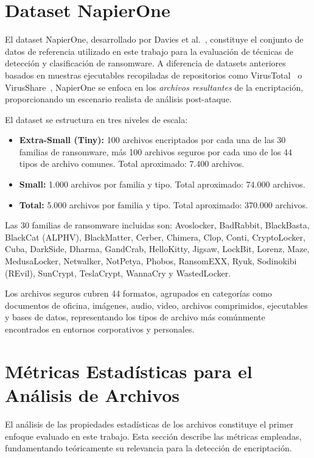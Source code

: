 \section{Dataset NapierOne}

El dataset NapierOne, desarrollado por Davies et al.~\cite{paper_7_napierone}, constituye el conjunto de datos de referencia utilizado en este trabajo para la evaluación de técnicas de detección y clasificación de ransomware. A diferencia de datasets anteriores basados en muestras ejecutables recopiladas de repositorios como VirusTotal~\cite{VirusTotal} o VirusShare~\cite{VirusShare}, NapierOne se enfoca en los \textit{archivos resultantes} de la encriptación, proporcionando un escenario realista de análisis post-ataque.

El dataset se estructura en tres niveles de escala:

\begin{itemize}
    \item \textbf{Extra-Small (Tiny):} 100 archivos encriptados por cada una de las 30 familias de ransomware, más 100 archivos seguros por cada uno de los 44 tipos de archivo comunes. Total aproximado: 7.400 archivos.
    \item \textbf{Small:} 1.000 archivos por familia y tipo. Total aproximado: 74.000 archivos.
    \item \textbf{Total:} 5.000 archivos por familia y tipo. Total aproximado: 370.000 archivos.
\end{itemize}

Las 30 familias de ransomware incluidas son: Avoslocker, BadRabbit, BlackBasta, BlackCat (ALPHV), BlackMatter, Cerber, Chimera, Clop, Conti, CryptoLocker, Cuba, DarkSide, Dharma, GandCrab, HelloKitty, Jigsaw, LockBit, Lorenz, Maze, MedusaLocker, Netwalker, NotPetya, Phobos, RansomEXX, Ryuk, Sodinokibi (REvil), SunCrypt, TeslaCrypt, WannaCry y WastedLocker.

Los archivos seguros cubren 44 formatos, agrupados en categorías como documentos de oficina, imágenes, audio, video, archivos comprimidos, ejecutables y bases de datos, representando los tipos de archivo más comúnmente encontrados en entornos corporativos y personales.

\section{Métricas Estadísticas para el Análisis de Archivos}

El análisis de las propiedades estadísticas de los archivos constituye el primer enfoque evaluado en este trabajo. Esta sección describe las métricas empleadas, fundamentando teóricamente su relevancia para la detección de encriptación.

